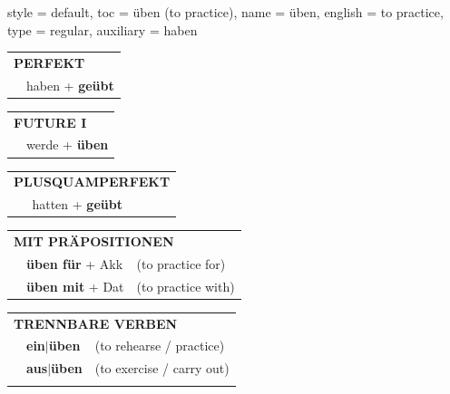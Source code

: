 \begin{verbentry}{
  style = {default},
  toc = {üben (to practice)},
  name = {üben},
  english = {to practice},
  type = {regular},
  auxiliary = {haben}
}
 \begin{tabular}{rl}
     \multicolumn{2}{l}{\textbf{PERFEKT}}\\
   & haben + \textbf{geübt}\\
  \end{tabular}
\hfill
   \begin{tabular}{rl}
    \multicolumn{2}{l}{\textbf{FUTURE I} }\\
   & werde + \textbf{üben}\\
  \end{tabular}
\hfill
   \begin{tabular}{rl}
      \multicolumn{2}{l}{\textbf{PLUSQUAMPERFEKT}}\\
   & hatten + \textbf{geübt}\\
  \end{tabular}

   \vspace{10pt}

   \begin{tabular}{lll}
      \multicolumn{3}{l}{\textbf{MIT PRÄPOSITIONEN}}\\
& \textbf{üben für} + Akk & (to practice for)\\
& \textbf{üben mit} + Dat & (to practice with)\\
\end{tabular}
  \hfill
   \begin{tabular}{lll}
      \multicolumn{3}{l}{\textbf{TRENNBARE VERBEN}}\\
 & \textbf{ein$|$üben} & (to rehearse / practice)\\
 & \textbf{aus$|$üben} & (to exercise / carry out)\\
\vspace{10pt}
  \end{tabular}

  \vspace{-5pt}
\end{verbentry}

